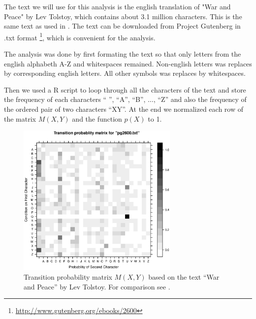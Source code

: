 \documentclass[a4paper, 11pt]{article}
\begin{document}
The text we will use for this analysis is the english translation of 
"War and Peace" by Lev Tolstoy, which contains about 3.1 million characters. 
This is the same text as used in \cite{Landgraf}. The text can be downloaded
from Project Gutenberg in .txt format 
\footnote{\href{http://www.gutenberg.org/ebooks/2600}
{http://www.gutenberg.org/ebooks/2600}}, which is convenient for the analysis.

The analysis was done by first formating the text so that only letters from
the english alphabeth A-Z and whitespaces remained. Non-english letters was
replaces by corresponding english letters. All other symbols was replaces by
whitespaces.

Then we used a R script to loop through all the characters of the text
and store the frequency of each characters `` '', ``A'', ``B'', 
$\dots$, ``Z'' and also the frequency of the ordered pair of two 
characters ``XY''. At the end we normalized each row of the matrix $M(X,Y)$
and the function $p(X)$ to 1.

\begin{figure}[h!]
  \centering
  \includegraphics[width=0.7\textwidth]{transprob_matrix-pg2600-.eps}
  \caption{Transition probability matrix $M(X,Y)$ based on the text
    ``War and Peace'' by Lev Tolstoy. For comparison see \cite{Landgraf}.}
  \label{fig:TransProbMat}
\end{figure}
\end{document}
